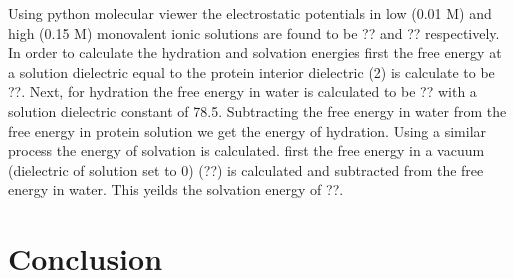 \documentclass[12pt]{article}
\begin{document}
Using python molecular viewer the electrostatic potentials in low (0.01 M) and high (0.15 M) monovalent ionic solutions are found to be ?? and ?? respectively. In order to calculate the hydration and solvation energies first the free energy at a solution dielectric equal to the protein interior dielectric (2) is calculate to be ??. Next, for hydration the free energy in water is calculated to be ?? with a solution dielectric constant of 78.5. Subtracting the free energy in water from the free energy in protein solution we get the energy of hydration. Using a similar process the energy of solvation is calculated. first the free energy in a vacuum (dielectric of solution set to 0) (??) is calculated and subtracted from the free energy in water. This yeilds the solvation energy of ??.



\section{Conclusion}


%
%
\end{document}
